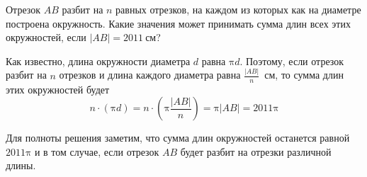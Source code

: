 

\begin{itemize}

\itB Отрезок $AB$ разбит на $n$ равных отрезков, на каждом из которых как на диаметре построена окружность. 
Какие значения может принимать сумма длин всех этих окружностей, если $|AB| = \SI{2011}{\text{см}}$?

\itr 
\begin{center}\end{center}

Как известно, длина окружности диаметра $d$ равна $\text{π}d$. 
Поэтому, если отрезок разбит на $n$ отрезков и длина каждого диаметра равна $\frac{|AB|}{n}$~см,
то сумма длин этих окружностей будет
$$
n \cdot (\text{π} d)=n \cdot \left(\text{π} \frac{|AB|}{n}\right)=\text{π} |AB|=2011\text{π}
$$

Для полноты решения заметим, что сумма длин окружностей останется равной $2011\text{π}$ и в 
том случае, если отрезок $AB$ будет разбит на отрезки различной длины.

\end{itemize}

